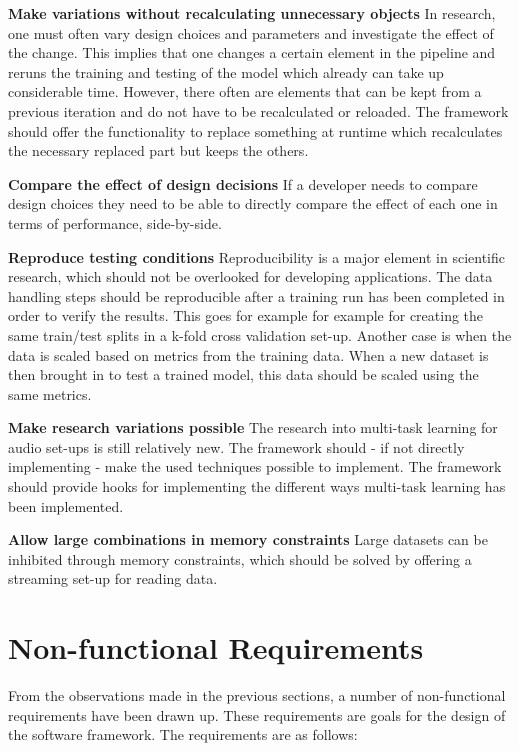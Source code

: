 \textbf{Make variations without recalculating unnecessary objects} In research, one must often vary design choices and parameters and investigate the effect of the change. This implies that one changes a certain element in the pipeline and reruns the training and testing of the model which already can take up considerable time. However, there often are elements that can be kept from a previous iteration and do not have to be recalculated or reloaded. The framework should offer the functionality to replace something at runtime which recalculates the necessary replaced part but keeps the others.

\textbf{Compare the effect of design decisions} If a developer needs to compare design choices they need to be able to directly compare the effect of each one in terms of performance, side-by-side. 

\textbf{Reproduce testing conditions} Reproducibility is a major element in scientific research, which should not be overlooked for developing applications. The data handling steps should be reproducible after a training run has been completed in order to verify the results. This goes for example for example for creating the same train/test splits in a k-fold cross validation set-up. Another case is when the data is scaled based on metrics from the training data. When a new dataset is then brought in to test a trained model, this data should be scaled using the same metrics.

\textbf{Make research variations possible} The research into multi-task learning for audio set-ups is still relatively new. The framework should - if not directly implementing - make the used techniques possible to implement. The framework should provide hooks for implementing the different ways multi-task learning has been implemented.

\textbf{Allow large combinations in memory constraints} Large datasets can be inhibited through memory constraints, which should be solved by offering a streaming set-up for reading data.


\section{Non-functional Requirements} \label{problem:nonfunc}

From the observations made in the previous sections, a number of non-functional requirements have been drawn up. These requirements are goals for the design of the software framework. The requirements are as follows:

